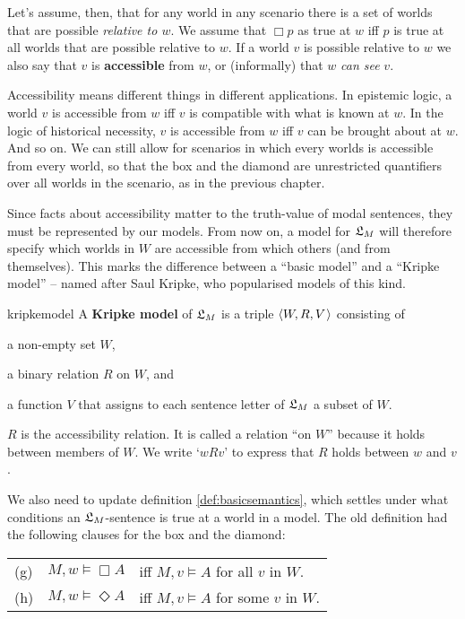 Let's assume, then, that for any world in any scenario there is a set of worlds
that are possible \emph{relative to $w$}. We assume that $\Box p$ as true at $w$
iff $p$ is true at all worlds that are possible relative to $w$. If a world $v$
is possible relative to $w$ we also say that $v$ is \textbf{accessible} from $w$,
or (informally) that $w$ \emph{can see} $v$.

Accessibility means different things in different applications. In epistemic
logic, a world $v$ is accessible from $w$ iff $v$ is compatible with what is
known at $w$. In the logic of historical necessity, $v$ is accessible from $w$
iff $v$ can be brought about at $w$. And so on. We can still allow for scenarios
in which every worlds is accessible from every world, so that the box and the
diamond are unrestricted quantifiers over all worlds in the scenario, as in the
previous chapter.

Since facts about accessibility matter to the truth-value of modal sentences,
they must be represented by our models. From now on, a model for $\mathfrak{L}_M$ will
therefore specify which worlds in $W$ are accessible from which others (and from
themselves). This marks the difference between a ``basic model'' and a ``Kripke
model'' -- named after Saul Kripke, who popularised models of this kind.
%
% 
\begin{definition}{}{kripkemodel}
  A \textbf{Kripke model} of $\mathfrak{L}_M$ is a triple $\t{W,R,V}$ consisting of
  \vspace{-3mm}
  \begin{itemize*}
  \item a non-empty set $W$,
  \item a binary relation $R$ on $W$, and
  \item a function $V$ that assigns to each sentence letter of $\mathfrak{L}_M$
  a subset of $W$.
  \end{itemize*}
\end{definition}
%
\noindent%
$R$ is the accessibility relation. It is called a relation ``on $W$'' because it
holds between members of $W$. We write `$wRv$' to express that $R$ holds between
$w$ and $v$.

We also need to update definition \ref{def:basicsemantics}, which settles under
what conditions an $\mathfrak{L}_M$-sentence is true at a world in a model. The old
definition had the following clauses for the box and the diamond:

\bigskip
\begin{tabular}{lll}
  (g) & $M,w \models \Box A$ &iff $M,v \models A$ for all $v$ in $ W$.\\
  (h) & $M,w \models \Diamond A$ &iff $M,v \models A$ for some $v$ in $ W$.
\end{tabular}
\bigskip

